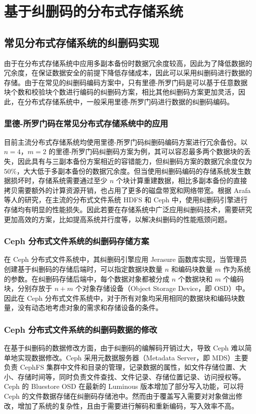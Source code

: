 \section{基于纠删码的分布式存储系统}
\subsection{常见分布式存储系统的纠删码实现}
由于在分布式存储系统中应用多副本备份时数据冗余度较高，因此为了降低数据的冗余度，在保证数据安全的前提下降低存储成本，因此可以采用纠删码进行数据的存储。由于在常见的纠删码编码方案中，只有里德-所罗门码是可以基于任意数据块个数和校验块个数进行编码的纠删码方案，相比其他纠删码方案更加灵活，因此，在分布式存储系统中，一般采用里德-所罗门码进行数据的纠删码编码。
\subsubsection{里德-所罗门码在常见分布式存储系统中的应用}
目前主流分布式存储系统均使用里德-所罗门码纠删码编码方案进行冗余备份。以 $n=4$，$m=2$ 的里德-所罗门码纠删码方案为例，其可以容忍最多两个数据块的丢失，因此具有与三副本备份方案相近的容错能力，但纠删码方案的数据冗余度仅为 $50\%$，大大低于多副本备份的数据冗余度。但当使用纠删码编码的存储系统发生数据损坏时，存储系统需要通过至少 $n$ 个块计算重建数据，相比多副本备份的直接拷贝需要额外的计算资源开销，也占用了更多的磁盘带宽和网络带宽。根据 Arafa 等人\cite{arafa2018evaluating}的研究，在主流的分布式文件系统 HDFS 和 Ceph 中，使用纠删码引擎进行存储均有明显的性能损失。因此若要在存储系统中广泛应用纠删码技术，需要研究更加高效的方案，比如提高系统并行度等，以解决纠删码的性能瓶颈问题。
\subsubsection{Ceph 分布式文件系统的纠删码存储方案}
在 Ceph 分布式文件系统中，其纠删码引擎应用 Jerasure 函数库实现，当管理员创建基于纠删码的存储后端时，可以指定数据块数量 $n$ 和编码块数量 $m$ 作为系统的参数。在纠删码存储后端中，每个数据对象都被分成 $n$ 个数据块和 $m$ 个编码块，分别存放于 $n+m$ 个对象存储设备（Object Storage Device，即 OSD）中。因此在 Ceph 分布式文件系统中，对于所有对象均采用相同的数据块和编码块数量，没有动态地考虑对象的需求和存储设备的条件。
\subsubsection{Ceph 分布式文件系统的纠删码数据的修改}
在基于纠删码的数据修改方面，由于纠删码的编解码开销过大，导致 Ceph 难以简单地实现数据修改。Ceph 采用元数据服务器（Metadata Server，即 MDS）主要负责 CephFS 集群中文件和目录的管理，记录数据的属性，如文件存储位置、大小、存储时间等，同时负责文件查找、文件记录、存储位置记录、访问授权等。Ceph 的 Bluestore\cite{aghayev2019file} OSD 在最新的 Luminous 版本增加了部分写入功能，可以将 Ceph 的文件数据存储在纠删码存储池中。然而由于覆盖写入需要对对象做出修改，增加了系统的复杂性，且由于需要进行解码和重新编码，写入效率不高。
